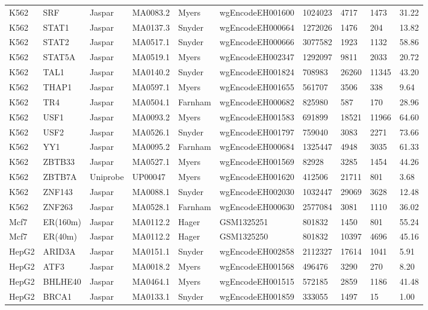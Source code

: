 {\begin{longtable}{p{1.1cm}p{1.0cm}p{1.0cm}p{1.0cm}p{1.0cm}p{2.3cm}p{1.0cm}p{0.8cm}p{0.8cm}p{0.8cm}}
K562 & SRF & Jaspar & MA0083.2 & Myers & wgEncodeEH001600 & 1024023 & 4717 & 1473 & 31.22\\
K562 & STAT1 & Jaspar & MA0137.3 & Snyder & wgEncodeEH000664 & 1272026 & 1476 & 204 & 13.82\\
K562 & STAT2 & Jaspar & MA0517.1 & Snyder & wgEncodeEH000666 & 3077582 & 1923 & 1132 & 58.86\\
K562 & STAT5A & Jaspar & MA0519.1 & Myers & wgEncodeEH002347 & 1292097 & 9811 & 2033 & 20.72\\
K562 & TAL1 & Jaspar & MA0140.2 & Snyder & wgEncodeEH001824 & 708983 & 26260 & 11345 & 43.20\\
K562 & THAP1 & Jaspar & MA0597.1 & Myers & wgEncodeEH001655 & 561707 & 3506 & 338 & 9.64\\
K562 & TR4 & Jaspar & MA0504.1 & Farnham & wgEncodeEH000682 & 825980 & 587 & 170 & 28.96\\
K562 & USF1 & Jaspar & MA0093.2 & Myers & wgEncodeEH001583 & 691899 & 18521 & 11966 & 64.60\\
K562 & USF2 & Jaspar & MA0526.1 & Snyder & wgEncodeEH001797 & 759040 & 3083 & 2271 & 73.66\\
K562 & YY1 & Jaspar & MA0095.2 & Farnham & wgEncodeEH000684 & 1325447 & 4948 & 3035 & 61.33\\
K562 & ZBTB33 & Jaspar & MA0527.1 & Myers & wgEncodeEH001569 & 82928 & 3285 & 1454 & 44.26\\
K562 & ZBTB7A & Uniprobe & UP00047 & Myers & wgEncodeEH001620 & 412506 & 21711 & 801 & 3.68\\
K562 & ZNF143 & Jaspar & MA0088.1 & Snyder & wgEncodeEH002030 & 1032447 & 29069 & 3628 & 12.48\\
K562 & ZNF263 & Jaspar & MA0528.1 & Farnham & wgEncodeEH000630 & 2577084 & 3081 & 1110 & 36.02\\
Mcf7 & ER(160m) & Jaspar & MA0112.2 & Hager & GSM1325251 & 801832 & 1450 & 801 & 55.24\\
Mcf7 & ER(40m) & Jaspar & MA0112.2 & Hager & GSM1325250 & 801832 & 10397 & 4696 & 45.16\\
HepG2 & ARID3A & Jaspar & MA0151.1 & Snyder & wgEncodeEH002858 & 2112327 & 17614 & 1041 & 5.91\\
HepG2 & ATF3 & Jaspar & MA0018.2 & Myers & wgEncodeEH001568 & 496476 & 3290 & 270 & 8.20\\
HepG2 & BHLHE40 & Jaspar & MA0464.1 & Myers & wgEncodeEH001515 & 572185 & 2859 & 1186 & 41.48\\
HepG2 & BRCA1 & Jaspar & MA0133.1 & Snyder & wgEncodeEH001859 & 333055 & 1497 & 15 & 1.00\\

\end{longtable}}
